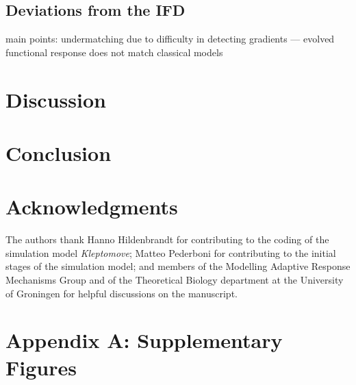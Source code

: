 \documentclass[11pt]{article}
\begin{document}
\subsection*{Deviations from the IFD}

main points: undermatching due to difficulty in detecting gradients --- evolved functional response does not match classical models


\section*{Discussion}

\section*{Conclusion}



\section*{Acknowledgments}

The authors thank Hanno Hildenbrandt for contributing to the coding of the simulation model \textit{Kleptomove}; 
Matteo Pederboni for contributing to the initial stages of the simulation model; 
and members of the Modelling Adaptive Response Mechanisms Group and of the Theoretical Biology department at the University of Groningen for helpful discussions on the manuscript.



\newpage{}

\section*{Appendix A: Supplementary Figures}
\end{document}

